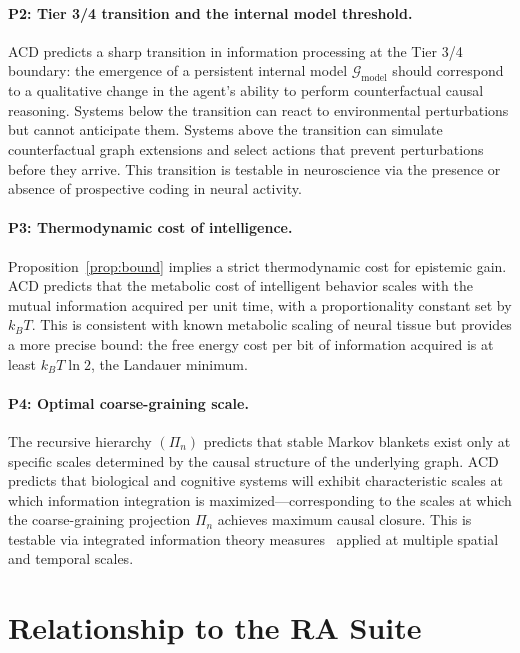 \documentclass[11pt,a4paper]{article}
\theoremstyle{remark}
\newcommand{\GG}{\mathcal{G}}
\begin{document}
\paragraph{P2: Tier 3/4 transition and the internal model threshold.}
ACD predicts a sharp transition in information processing at the Tier 3/4 boundary:
the emergence of a persistent internal model $\GG_{\mathrm{model}}$ should
correspond to a qualitative change in the agent's ability to perform
counterfactual causal reasoning. Systems below the transition can react to
environmental perturbations but cannot anticipate them. Systems above the
transition can simulate counterfactual graph extensions and select actions that
prevent perturbations before they arrive. This transition is testable in
neuroscience via the presence or absence of prospective coding in neural
activity.

\paragraph{P3: Thermodynamic cost of intelligence.}
Proposition~\ref{prop:bound} implies a strict thermodynamic cost for epistemic
gain. ACD predicts that the metabolic cost of intelligent behavior scales with
the mutual information acquired per unit time, with a proportionality constant
set by $k_BT$. This is consistent with known metabolic scaling of neural tissue
but provides a more precise bound: the free energy cost per bit of information
acquired is at least $k_BT \ln 2$, the Landauer minimum.

\paragraph{P4: Optimal coarse-graining scale.}
The recursive hierarchy $(\Pi_n)$ predicts that stable Markov blankets exist only
at specific scales determined by the causal structure of the underlying graph.
ACD predicts that biological and cognitive systems will exhibit characteristic
scales at which information integration is maximized---corresponding to the
scales at which the coarse-graining projection $\Pi_n$ achieves maximum causal
closure. This is testable via integrated information theory
measures~\citep{Tononi2004} applied at multiple spatial and temporal scales.

\section{Relationship to the RA Suite}
\label{sec:suite}
\end{document}

